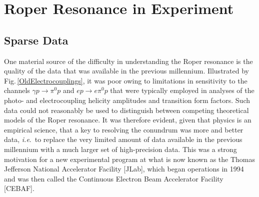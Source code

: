\setcounter{equation}{0}
\setcounter{figure}{0}
\section{Roper Resonance in Experiment}
\label{Experiment}
%
\subsection{Sparse Data}
%
One material source of the difficulty in understanding the Roper resonance is the quality of the data that was available in the previous millennium.  Illustrated by Fig.\,\ref{OldElectrocouplings}, it was poor owing to limitations in sensitivity to the channels $\gamma p \to \pi^0 p$ and $ep \to e\pi^0 p$ that were typically employed in analyses of the photo- and electrocoupling helicity amplitudes and transition form factors.  Such data could not reasonably be used to distinguish between competing theoretical models of the Roper resonance.  It was therefore evident, given that physics is an empirical science, that a key to resolving the conundrum was more and better data, \emph{i.e}.\ to replace the very limited amount of data available in the previous millennium with a much larger set of high-precision data. This was a strong motivation for a new experimental program at what is now known as the Thomas Jefferson National Accelerator Facility [JLab], which began operations in 1994 and was then called the Continuous Electron Beam Accelerator Facility [CEBAF].

